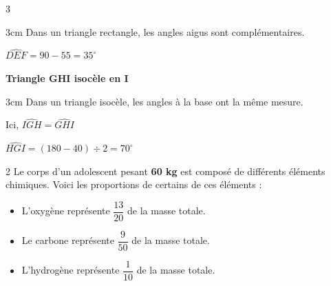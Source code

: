 \documentclass[a4paper]{book}
\begin{document}
{\begin{exerciceNote}{3}
\begin{minipage}{0.32\linewidth}
            \begin{ZoneReponse}{3cm}
                Dans un triangle rectangle, les angles aigus sont complémentaires.

                \medskip

                $\widehat{DEF}=90-55=35^\circ$
            \end{ZoneReponse}
        \end{minipage}
        \vline
        \begin{minipage}{0.32\linewidth}
             \begin{center}     
                \textbf{Triangle GHI isocèle en I} 
           
            \end{center}
            
            \begin{ZoneReponse}{3cm}
                Dans un triangle isocèle, les angles à la base ont la même mesure.

                Ici, $\widehat{IGH}=\widehat{GHI}$

                \medskip

                $\widehat{HGI}=(180-40)\div2=70^\circ$
            \end{ZoneReponse}
        \end{minipage}
    \end{exerciceNote}


    \begin{exerciceNote}{2}
        Le corps d'un adolescent pesant \textbf{60 kg} est composé de différents éléments chimiques. Voici les proportions de certains de ces éléments :
        \begin{itemize}
            \item L'oxygène représente $\dfrac{13}{20}$ de la masse totale.
            \item Le carbone représente $\dfrac{9}{50}$ de la masse totale.
            \item L'hydrogène représente $\dfrac{1}{10}$ de la masse totale.
        \end{itemize}
        

\end{exerciceNote}}
\end{document}
